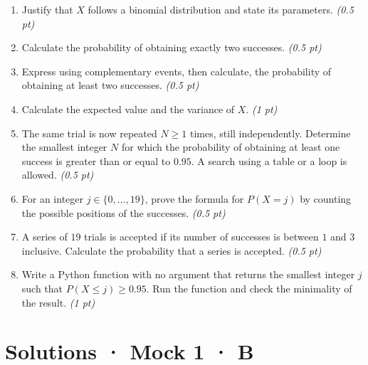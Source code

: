 \begin{enumerate}

\item Justify that $X$ follows a binomial distribution and state its parameters. \hfill\textit{(0.5 pt)}

\item Calculate the probability of obtaining exactly two successes. \hfill\textit{(0.5 pt)}

\item Express using complementary events, then calculate, the probability of obtaining at least two successes. \hfill\textit{(0.5 pt)}

\item Calculate the expected value and the variance of $X$. \hfill\textit{(1 pt)}

\item The same trial is now repeated $N\ge1$ times, still independently. Determine the smallest integer $N$ for which the probability of obtaining at least one success is greater than or equal to $0.95$. A search using a table or a loop is allowed. \hfill\textit{(0.5 pt)}

\item For an integer $j\in\{0,\ldots,19\}$, prove the formula for $P(X=j)$ by counting the possible positions of the successes. \hfill\textit{(0.5 pt)}

\item A series of $19$ trials is accepted if its number of successes is between $1$ and $3$ inclusive. Calculate the probability that a series is accepted. \hfill\textit{(0.5 pt)}

\item Write a Python function with no argument that returns the smallest integer $j$ such that $P(X\le j)\ge0.95$. Run the function and check the minimality of the result. \hfill\textit{(1 pt)}

\end{enumerate}

\ifprof\clearpage

\section*{Solutions · Mock 1 · B}\label{cor:5-4}

